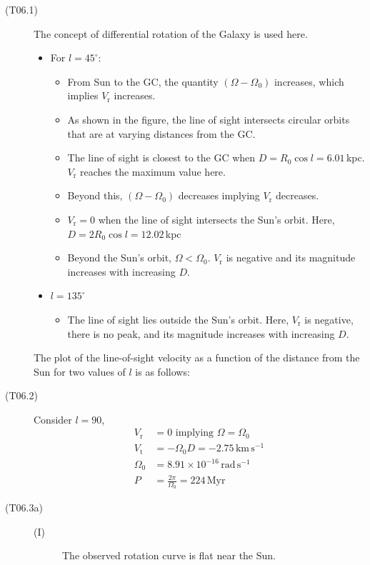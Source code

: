 \begin{description}
\item[(T06.1)]
  The concept of differential rotation of the Galaxy is used here.
  \begin{itemize}
  \item For $l = 45^\circ$:
    \begin{itemize}
    \item From Sun to the GC, the quantity $(\Omega - \Omega_0)$ increases,
      which implies $V_{\mathrm{r}}$ increases.
    \item As shown in the figure, the line of sight intersects circular orbits
      that are at varying distances from the GC.
    \item The line of sight is closest to the GC when
      $D = R_0\cos l = 6.01$\,kpc. $V_{\mathrm{r}}$ reaches the maximum value
      here.
    \item Beyond this, $(\Omega - \Omega_0)$ decreases implying
      $V_{\mathrm{r}}$ decreases.
    \item $V_{\mathrm{r}} = 0$ when the line of sight intersects the Sun's
      orbit. Here, $D = 2R_0\cos l = 12.02$\,kpc
    \item Beyond the Sun's orbit, $\Omega < \Omega_0$. $V_{\mathrm{r}}$ is
      negative and its magnitude increases with increasing $D$.
    \end{itemize}
  \item $l = 135^\circ$
    \begin{itemize}
    \item The line of sight lies outside the Sun's orbit. Here,
      $V_{\mathrm{r}}$ is negative, there is no peak, and its magnitude
      increases with increasing $D$.
    \end{itemize}
  \end{itemize}
  The plot of the line-of-sight velocity as a function of the distance from
  the Sun for two values of $l$ is as follows:
\item[(T06.2)] Consider $l = 90$,
  \begin{align*}
    V_{\mathrm{r}} &= 0 \text{ implying } \Omega = \Omega_0
       \tag*{(0.5)}\\
    V_{\mathrm{t}} &= -\Omega_0 D = -2.75\,\mathrm{km\,s^{-1}}
       \tag*{(0.5)}\\
    \Omega_0 &= 8.91\times10^{-16}\,\mathrm{rad\,s^{-1}}
       \tag*{(1.0)}\\
    P &= \frac{2\pi}{\Omega_0} = 224\,\mathrm{Myr}
       \tag*{(1.0)}
  \end{align*}
\item[(T06.3a)] \mbox{}
  \begin{description}
  \item[(I)] The observed rotation curve is flat near the Sun.


\end{description}
\end{description}
